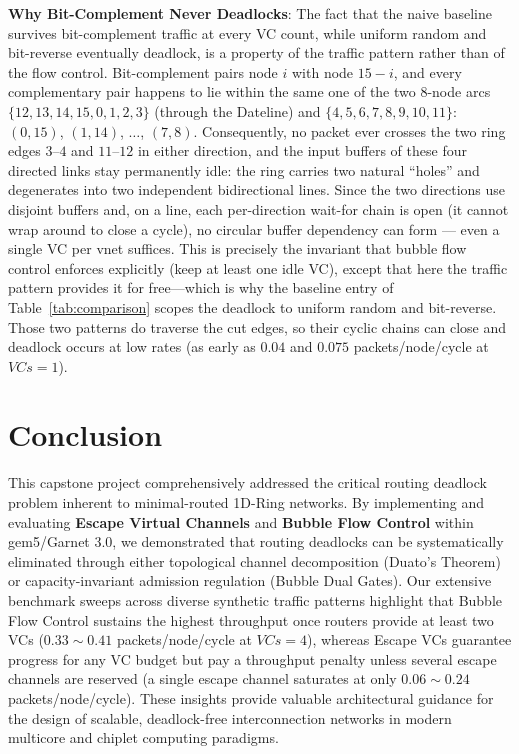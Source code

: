 \documentclass[10pt,journal,compsoc]{IEEEtran}
\begin{document}
\textbf{Why Bit-Complement Never Deadlocks}: The fact that the naive baseline survives bit-complement traffic at every VC count, while uniform random and bit-reverse eventually deadlock, is a property of the traffic pattern rather than of the flow control. Bit-complement pairs node $i$ with node $15-i$, and every complementary pair happens to lie within the same one of the two 8-node arcs $\{12,13,14,15,0,1,2,3\}$ (through the Dateline) and $\{4,5,6,7,8,9,10,11\}$: $(0,15)$, $(1,14)$, $\dots$, $(7,8)$. Consequently, no packet ever crosses the two ring edges $3$--$4$ and $11$--$12$ in either direction, and the input buffers of these four directed links stay permanently idle: the ring carries two natural ``holes'' and degenerates into two independent bidirectional lines. Since the two directions use disjoint buffers and, on a line, each per-direction wait-for chain is open (it cannot wrap around to close a cycle), no circular buffer dependency can form --- even a single VC per vnet suffices. This is precisely the invariant that bubble flow control enforces explicitly (keep at least one idle VC), except that here the traffic pattern provides it for free---which is why the baseline entry of Table~\ref{tab:comparison} scopes the deadlock to uniform random and bit-reverse. Those two patterns do traverse the cut edges, so their cyclic chains can close and deadlock occurs at low rates (as early as $0.04$ and $0.075$ packets/node/cycle at $VCs=1$).


\section{Conclusion}
This capstone project comprehensively addressed the critical routing deadlock problem inherent to minimal-routed 1D-Ring networks. By implementing and evaluating \textbf{Escape Virtual Channels} and \textbf{Bubble Flow Control} within gem5/Garnet 3.0, we demonstrated that routing deadlocks can be systematically eliminated through either topological channel decomposition (Duato's Theorem) or capacity-invariant admission regulation (Bubble Dual Gates). Our extensive benchmark sweeps across diverse synthetic traffic patterns highlight that Bubble Flow Control sustains the highest throughput once routers provide at least two VCs ($0.33 \sim 0.41$ packets/node/cycle at $VCs=4$), whereas Escape VCs guarantee progress for any VC budget but pay a throughput penalty unless several escape channels are reserved (a single escape channel saturates at only $0.06 \sim 0.24$ packets/node/cycle). These insights provide valuable architectural guidance for the design of scalable, deadlock-free interconnection networks in modern multicore and chiplet computing paradigms.
\end{document}
